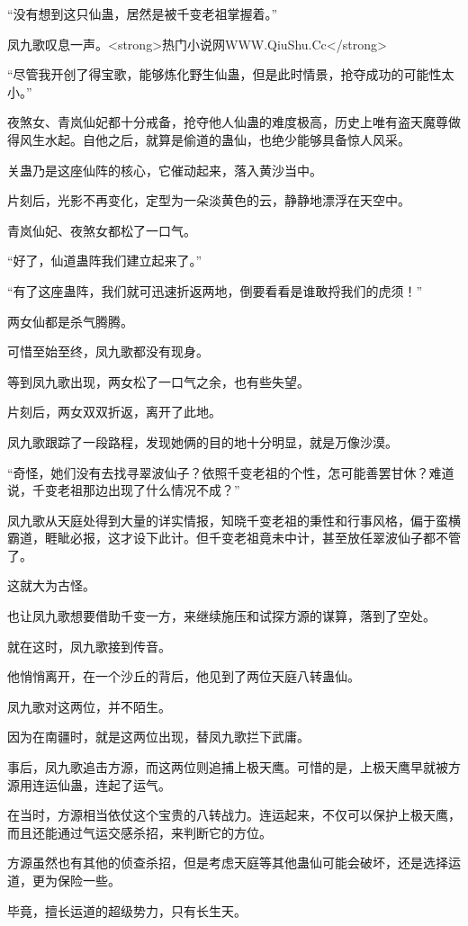 \begin{this_body}
“没有想到这只仙蛊，居然是被千变老祖掌握着。”

凤九歌叹息一声。<strong>热门小说网WWW.QiuShu.Cc</strong>

“尽管我开创了得宝歌，能够炼化野生仙蛊，但是此时情景，抢夺成功的可能性太小。”

夜煞女、青岚仙妃都十分戒备，抢夺他人仙蛊的难度极高，历史上唯有盗天魔尊做得风生水起。自他之后，就算是偷道的蛊仙，也绝少能够具备惊人风采。

关蛊乃是这座仙阵的核心，它催动起来，落入黄沙当中。

片刻后，光影不再变化，定型为一朵淡黄色的云，静静地漂浮在天空中。

青岚仙妃、夜煞女都松了一口气。

“好了，仙道蛊阵我们建立起来了。”

“有了这座蛊阵，我们就可迅速折返两地，倒要看看是谁敢捋我们的虎须！”

两女仙都是杀气腾腾。

可惜至始至终，凤九歌都没有现身。

等到凤九歌出现，两女松了一口气之余，也有些失望。

片刻后，两女双双折返，离开了此地。

凤九歌跟踪了一段路程，发现她俩的目的地十分明显，就是万像沙漠。

“奇怪，她们没有去找寻翠波仙子？依照千变老祖的个性，怎可能善罢甘休？难道说，千变老祖那边出现了什么情况不成？”

凤九歌从天庭处得到大量的详实情报，知晓千变老祖的秉性和行事风格，偏于蛮横霸道，睚眦必报，这才设下此计。但千变老祖竟未中计，甚至放任翠波仙子都不管了。

这就大为古怪。

也让凤九歌想要借助千变一方，来继续施压和试探方源的谋算，落到了空处。

就在这时，凤九歌接到传音。

他悄悄离开，在一个沙丘的背后，他见到了两位天庭八转蛊仙。

凤九歌对这两位，并不陌生。

因为在南疆时，就是这两位出现，替凤九歌拦下武庸。

事后，凤九歌追击方源，而这两位则追捕上极天鹰。可惜的是，上极天鹰早就被方源用连运仙蛊，连起了运气。

在当时，方源相当依仗这个宝贵的八转战力。连运起来，不仅可以保护上极天鹰，而且还能通过气运交感杀招，来判断它的方位。

方源虽然也有其他的侦查杀招，但是考虑天庭等其他蛊仙可能会破坏，还是选择运道，更为保险一些。

毕竟，擅长运道的超级势力，只有长生天。


\end{this_body}
